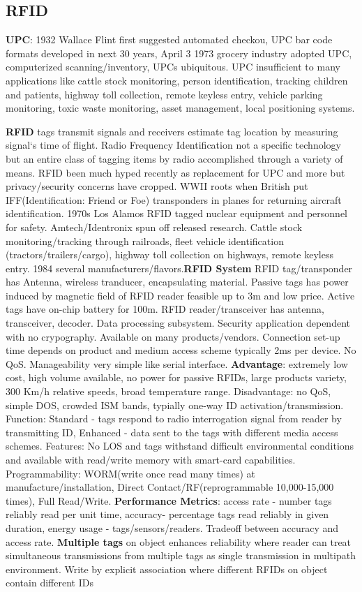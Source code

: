 \documentclass[9pt]{extarticle}
\begin{document}
\begin{multicols}{2}
\section{RFID}

\textbf{UPC}: 1932 Wallace Flint first suggested automated checkou, UPC bar code formats developed in next 30 years, April 3 1973 grocery industry adopted UPC, computerized scanning/inventory, UPCs ubiquitous. UPC insufficient to many applications like cattle stock monitoring, person identification, tracking children and patients, highway toll collection, remote keyless entry, vehicle parking monitoring, toxic waste monitoring, asset management, local positioning systems.

\textbf{RFID} tags transmit signals and receivers estimate tag location
by measuring signal‘s time of flight. Radio Frequency Identification not a specific technology but an entire class of tagging items by radio accomplished through a variety of means. RFID been much hyped recently as replacement for UPC and more but privacy/security concerns have cropped. WWII roots when British put IFF(Identification: Friend or Foe) transponders in planes for returning aircraft identification. 1970s Los Alamos RFID tagged nuclear equipment and personnel for safety. Amtech/Identronix spun off released research. Cattle stock monitoring/tracking through railroads, fleet vehicle identification (tractors/trailers/cargo), highway toll collection on highways, remote keyless entry. 1984 several manufacturers/flavors.\textbf{RFID System} RFID tag/transponder has Antenna, wireless tranducer, encapsulating material. Passive tags has power induced by magnetic field of RFID reader feasible up to 3m and low price. Active tags have on-chip battery for 100m. RFID reader/transceiver has antenna, transceiver, decoder. Data processing subsystem. Security application dependent with no crypography. Available on many products/vendors. Connection set-up time depends on product and medium access scheme typically 2ms per device. No QoS. Manageability very simple like serial interface. \textbf{Advantage}: extremely low cost, high volume available, no power for passive RFIDs, large  products variety, 300 Km/h relative speeds, broad temperature range. Disadvantage: no QoS, simple DOS, crowded ISM bands, typially one-way ID activation/transmission. Function: Standard - tags respond to radio interrogation signal from reader by transmitting ID, Enhanced - data sent to the tags with different media access schemes.  Features: No LOS and tags withstand difficult environmental conditions and available with read/write memory with smart-card capabilities. Programmability: WORM(write once read many times) at manufacture/installation, Direct Contact/RF(reprogrammable 10,000-15,000 times), Full Read/Write. \textbf{Performance Metrics}: access rate - number tags reliably read per unit time, accuracy- percentage tags read reliably in given duration, energy usage - tags/sensors/readers. Tradeoff between accuracy and access rate. \textbf{ Multiple tags} on object enhances reliability where reader can treat simultaneous transmissions from multiple tags as single transmission in multipath environment. Write by explicit association where different RFIDs on object contain different IDs 
\end{multicols}
\end{document}
